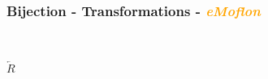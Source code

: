 \documentclass{beamer}
\begin{document}
\begin{frame}
\frametitle{Bijection - \textbf{Transformations} - \textbf{\textit{\textcolor{orange}{eMoflon}}}}
\begin{figure}[ht]
\begin{mdframed}
    \centering
    \mbox{\qquad\qquad\qquad
          }
\end{mdframed}          
    \label{fig:T1}
\end{figure}

\begin{center}
$\overleftarrow{R}$
\end{center}

\begin{figure}[ht]
    \centering
    \mbox{
          }
    \label{fig:T2}
\end{figure}

\end{frame}
\end{document}
